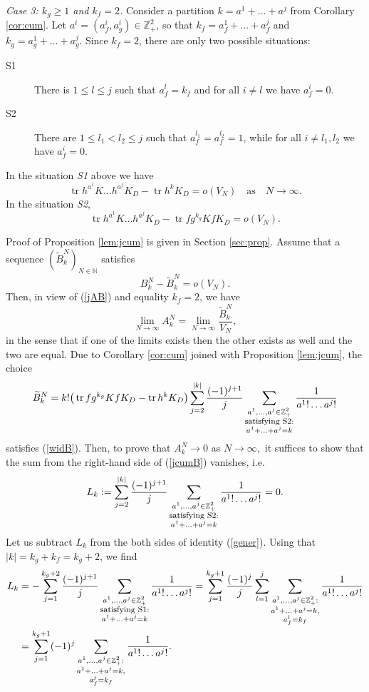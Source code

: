 \documentclass{article}
\numberwithin{equation}{section}
\newcommand{\mZ}{\mathbb{Z}}
\newcommand{\mN}{\mathbb{N}}
\newcommand{\tr}{\operatorname{tr}}
\newcommand{\wid}{\widetilde}
\newcommand{\ra}{\rightarrow}
\newcommand{\fr}{\frac}
\newcommand{\sli}{\sum\limits}
\newcommand{\lbl}{\label}
\newcommand{\ass}{\quad\mbox{as}\quad}
\newcommand{\rprop}{Proposition \nolinebreak}
\newcommand{\rcor}{Corollary \nolinebreak}
\newcommand{\bee}{\begin{equation}}
\newcommand{\eee}{\end{equation}}
\newcommand{\bpp}{\begin{prop}}
\newcommand{\epp}{\end{prop}}
\newcommand{\non}{\nonumber}
\newcommand{\sck}{\substack}
\begin{document}
{\it Case 3: $k_g\geq 1$ and $k_f=2$.}
Consider a partition $k=a^1+\ldots +a^j$ from
\rcor\ref{cor:cum}.
Let $a^i=(a^i_f,a^i_g)\in\mZ^{2}_+$,
so that $k_f=a^1_f+\ldots +a^j_f$ and $k_g=a^1_g+\ldots +a^j_g$.
Since $k_f=2$, there are only two possible situations:
\begin{description}
\item[S1] There is $1\leq l\leq j$
such that $a^l_f=k_f$ and for all $i\neq l$ we have $a^i_f=0$.

\item[S2] There are $1\leq l_1<l_2\leq j$
such that $a^{l_1}_f=a^{l_2}_f=1$,
while for all $i\neq l_1,l_2$ we have $a^i_f=0$.
\end{description}
%
\bpp\lbl{lem:jcum}
In the situation {\it S1} above we have
\bee\lbl{j1}
\tr h^{a^1}K\ldots h^{a^j}K_{D} -\tr h^k K_{D}
= o(V_N) \ass N\ra\infty.
\eee
In the situation {\it S2},
\bee\lbl{j2}
\tr h^{a^1}K\ldots h^{a^j}K_{D} -\tr fg^{k_g} K fK_{D}
= o(V_N).
\eee
\epp
%
Proof of Proposition \ref{lem:jcum} is given in Section \ref{sec:prop}.
Assume that a sequence $(\wid B^N_k)_{N\in\mN}$ satisfies
\bee\lbl{widB}
B_k^N - \wid B_k^N = o(V_N).
\eee
Then, in view of (\ref{jAB}) and equality $k_f=2$, we have
$$
\lim\limits_{N\ra\infty} A_k^N = \lim\limits_{N\ra\infty} \fr{\wid B^N_k}{V_N},
$$
in the sense that if one of the limits exists
then the other exists as well and the two are equal.
Due to Corollary \ref{cor:cum} joined with \rprop \ref{lem:jcum}, the choice
\bee\lbl{jcumB}
\wid B^N_k =
k! \big(
\tr f g^{k_g}K fK_{D} - \tr h^k K_D
\big)
\sli_{j=2}^{|k|}\fr{(-1)^{j+1}}{j}
\sli_{\sck{a^1,\ldots,a^j\in\mZ^2_+ \\ \mbox{\footnotesize{satisfying S2}} : \\ a^1+\ldots+a^j=k }}
\fr{1}{a^1!\ldots a^j!}
\eee
satisfies (\ref{widB}).
Then, to prove that $A_k^N\ra 0$ as $N\ra\infty,$
it suffices to show that the sum from the right-hand side of (\ref{jcumB}) vanishes, i.e.
$$
L_k:=\sli_{j=2}^{|k|}\fr{(-1)^{j+1}}{j}
\sli_{\sck{a^1,\ldots,a^j\in\mZ^2_+ \\ \mbox{\footnotesize{satisfying S2}} : \\ a^1+\ldots+a^j=k }}
\fr{1}{a^1!\ldots a^j!}=0.
$$
Let us subtract $L_k$ from the both sides of identity (\ref{gener}).
Using that
$|k|=k_g+k_f=k_g+2$,
we find
\begin{align}\non
L_k&=
-\sli_{j=1}^{k_g+2}
\fr{(-1)^{j+1}}{j}
\sli_{\sck{a^1,\ldots,a^j\in\mZ^2_+ \\ \mbox{\footnotesize{satisfying S1}} : \\ a^1+\ldots+a^j=k }}
\fr{1}{a^1!\ldots a^j!}
=
\sli_{j=1}^{k_g+1}
\fr{(-1)^{j}}{j}
\sli_{l=1}^j
\sli_{\sck{a^1,\ldots,a^j\in\mZ^2_+: \\ a^1+\ldots+a^j=k, \\ a_f^l=k_f}}
\fr{1}{a^1!\ldots a^j!}
\\ \lbl{Lk1}
&=
\sli_{j=1}^{k_g+1}
(-1)^{j}
\sli_{\sck{a^1,\ldots,a^j\in\mZ^2_+: \\ a^1+\ldots+a^j=k, \\ a_f^j=k_f}}
\fr{1}{a^1!\ldots a^j!}.
\end{align}
\end{document}
